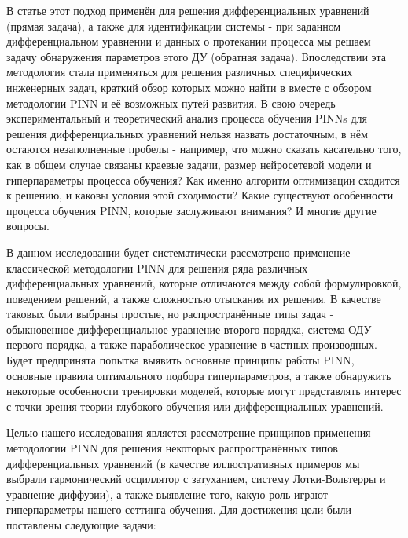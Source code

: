 \documentclass[a4paper, 12pt]{article}
\begin{document}
В статье \cite{RAISSI2019686} этот подход применён для решения дифференциальных уравнений (прямая задача), а также для идентификации системы - при заданном дифференциальном уравнении и данных о протекании процесса мы решаем задачу обнаружения параметров этого ДУ (обратная задача). Впоследствии эта методология стала применяться для решения различных специфических инженерных задач, краткий обзор которых можно найти в \cite{Cuomo2022} вместе с обзором методологии PINN и её возможных путей развития. В свою очередь экспериментальный и теоретический анализ процесса обучения PINNs для решения дифференциальных уравнений нельзя назвать достаточным, в нём остаются незаполненные пробелы - например, что можно сказать касательно того, как в общем случае связаны краевые задачи, размер нейросетевой модели и гиперпараметры процесса обучения? Как именно алгоритм оптимизации сходится к решению, и каковы условия этой сходимости? Какие существуют особенности процесса обучения PINN, которые заслуживают внимания? И многие другие вопросы.

В данном исследовании будет систематически рассмотрено применение классической методологии PINN для решения ряда различных дифференциальных уравнений, которые отличаются между собой формулировкой, поведением решений, а также сложностью отыскания их решения. В качестве таковых были выбраны простые, но распространённые типы задач - обыкновенное дифференциальное уравнение второго порядка, система ОДУ первого порядка, а также параболическое уравнение в частных производных. Будет предпринята попытка выявить основные принципы работы PINN, основные правила оптимального подбора гиперпараметров, а также обнаружить некоторые особенности тренировки моделей, которые могут представлять интерес с точки зрения теории глубокого обучения или дифференциальных уравнений.

Целью нашего исследования является рассмотрение принципов применения методологии PINN для решения некоторых распространённых типов дифференциальных уравнений (в качестве иллюстративных примеров мы выбрали гармонический осциллятор с затуханием, систему Лотки-Вольтерры и уравнение диффузии), а также выявление того, какую роль играют гиперпараметры нашего сеттинга обучения. Для достижения цели были поставлены следующие задачи:
\end{document}
